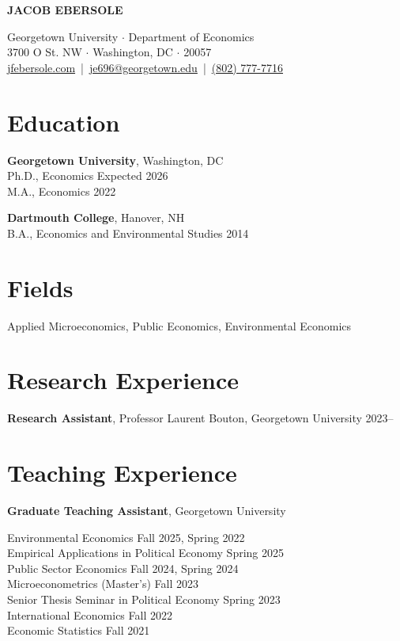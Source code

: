 \documentclass[11pt]{article}
\newcommand{\header}[2]{
    \begin{center}
        {\LARGE \textbf{#1}} \\
        \vspace{10pt}
        #2
    \end{center}
}
\begin{document}
\header{JACOB EBERSOLE}{
  Georgetown University $\cdot$ Department of Economics \\
  3700 O St. NW $\cdot$ Washington, DC $\cdot$ 20057 \\
  \vspace{6pt}
  \href{https://jfebersole.com}{jfebersole.com} \,|\, 
  \href{mailto:je696@georgetown.edu}{je696@georgetown.edu} \,|\, 
  \href{tel:+18027777716}{(802) 777-7716}
}

\section*{Education}

\textbf{Georgetown University}, Washington, DC \\
Ph.D., Economics \hfill Expected 2026 \\
M.A., Economics \hfill 2022

\textbf{Dartmouth College}, Hanover, NH \\
B.A., Economics and Environmental Studies \hfill 2014

\section*{Fields}
Applied Microeconomics, Public Economics, Environmental Economics
\section*{Research Experience}

\textbf{Research Assistant}, Professor Laurent Bouton, Georgetown University \hfill 2023–

\section*{Teaching Experience}

\textbf{Graduate Teaching Assistant}, Georgetown University

Environmental Economics \hfill Fall 2025, Spring 2022 \\
Empirical Applications in Political Economy \hfill Spring 2025 \\
Public Sector Economics \hfill Fall 2024, Spring 2024 \\
Microeconometrics (Master's) \hfill Fall 2023 \\
Senior Thesis Seminar in Political Economy \hfill Spring 2023 \\
International Economics \hfill Fall 2022 \\
Economic Statistics \hfill Fall 2021
\end{document}
